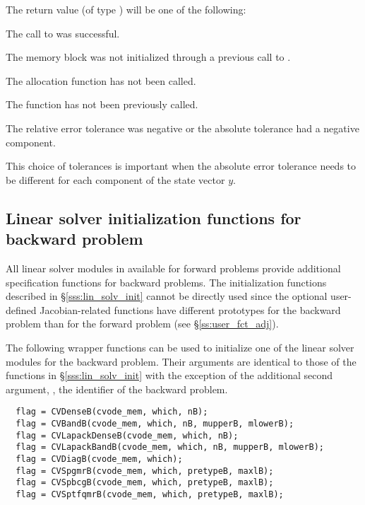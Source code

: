 {
  The return value  (of type ) will be one of the following:
  \begin{args}
  \item[\Id{CV\_SUCCESS}]
    The call to  was successful.
  \item[\Id{CV\_MEM\_NULL}] 
    The {\cvodes} memory block was not initialized through a previous call to
    .
  \item[\Id{CV\_NO\_MALLOC}] 
    The allocation function  has not been called.
  \item[\Id{CV\_NO\_ADJ}]
    The function  has not been previously called.
  \item[\Id{CV\_ILL\_INPUT}] 
    The relative error tolerance was negative or the absolute tolerance
    had a negative component.
  \end{args}
}
{
  This choice of tolerances is important when the absolute error tolerance needs to
  be different for each component of the state vector $y$.
}

\subsection{Linear solver initialization functions for backward problem}
\label{sss:lin_solv_b}

All linear solver modules in {\cvodes} available for forward problems
provide additional specification functions for backward problems.
The initialization functions described in \S\ref{sss:lin_solv_init} cannot be
directly used since the optional user-defined Jacobian-related functions have
different prototypes for the backward problem than for the forward problem
(see \S\ref{ss:user_fct_adj}). 

The following wrapper functions can be used to initialize one of the linear
solver modules for the backward problem. Their arguments are identical to those
of the functions in \S\ref{sss:lin_solv_init} with the exception of the additional
second argument, , the identifier of the backward problem.
\begin{verbatim}
  flag = CVDenseB(cvode_mem, which, nB);
  flag = CVBandB(cvode_mem, which, nB, mupperB, mlowerB);
  flag = CVLapackDenseB(cvode_mem, which, nB);
  flag = CVLapackBandB(cvode_mem, which, nB, mupperB, mlowerB);
  flag = CVDiagB(cvode_mem, which);
  flag = CVSpgmrB(cvode_mem, which, pretypeB, maxlB);
  flag = CVSpbcgB(cvode_mem, which, pretypeB, maxlB);
  flag = CVSptfqmrB(cvode_mem, which, pretypeB, maxlB);
\end{verbatim}

